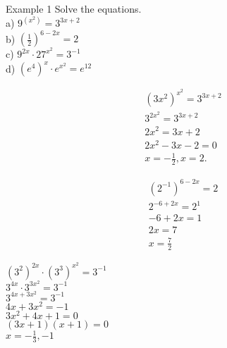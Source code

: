 \documentclass{report}
\begin{document}
\bigbreak \noindent \bigbreak \noindent
\pagebreak
\begin{mdframed}
\begin{large}
\begin{center}
  
Example 1 Solve the equations. \\

\bigbreak
\noindent a) $9^{\left(x^2\right)}=3^{3 x+2}$ \\
\bigbreak
\noindent b) $\left(\frac{1}{2}\right)^{6-2 x}=2$ \\
\bigbreak
\noindent c) $9^{2 x} \cdot 27^{x^2}=3^{-1}$ \\
\bigbreak
\noindent d) $\left(e^4\right)^x \cdot e^{x^2}=e^{12}$ \\

\end{center}
\end{large}
\end{mdframed}


\begin{align*}
	(3x^2)^{x^{2}} = 3^{3x+2} \\
	3^{2x^{2}} = 3^{3x+2} \\ 
	2x^2  = 3x+2 \\
	2x^2-3x-2 = 0 \\
	x = -\frac{1}{2}, x=2
.\end{align*}
\bigbreak
{}

\begin{align*}
	\left(2^{-1}\right)^{6-2 x}=2 \\
	2^{-6+2 x}=2^1 \\
	-6+2x=1 \\
	2x=7 \\
	x = \frac{7}{2}
\end{align*}
\bigbreak
{}

\bigbreak \noindent
\begin{center}
  $\left(3^2\right)^{2 x} \cdot\left(3^3\right)^{x^2}=3^{-1}$ \\
  $3^{4 x} \cdot 3^{3 x^2}=3^{-1}$ \\
  $3^{4 x+3 x^2}=3^{-1}$ \\
  $4 x+3 x^2=-1$ \\
  $3 x^2+4 x+1=0$ \\
  $(3 x+1)(x+1)=0$ \\
  $x=-\frac{1}{3},-1$
\end{center}
\bigbreak \noindent
{}
\end{document}
